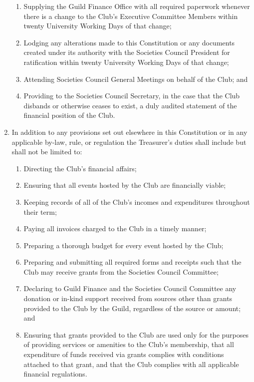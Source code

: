\documentclass[12pt]{article}
\begin{document}
\begin{enumerate}[label=9.\arabic*]
\begin{enumerate}[label=\theenumi.\arabic*]
        \item Supplying the Guild Finance Office with all required paperwork whenever there is a change to the Club's Executive Committee Members within twenty University Working Days of that change;
        \item Lodging any alterations made to this Constitution or any documents created under its authority with the Societies Council President for ratification within twenty University Working Days of that change;
        \item Attending Societies Council General Meetings on behalf of the Club; and
        \item Providing to the Societies Council Secretary, in the case that the Club disbands or otherwise ceases to exist, a duly audited statement of the financial position of the Club.
    \end{enumerate}
\item In addition to any provisions set out elsewhere in this Constitution or in any applicable by-law, rule, or regulation the Treasurer's duties shall include but shall not be limited to:
    \begin{enumerate}[label=\theenumi.\arabic*]
        \item Directing the Club's financial affairs;
        \item Ensuring that all events hosted by the Club are financially viable;
        \item Keeping records of all of the Club's incomes and expenditures throughout their term;
        \item Paying all invoices charged to the Club in a timely manner;
        \item Preparing a thorough budget for every event hosted by the Club;
        \item Preparing and submitting all required forms and receipts such that the Club may receive grants from the Societies Council Committee;
        \item Declaring to Guild Finance and the Societies Council Committee any donation or in-kind support received from sources other than grants provided to the Club by the Guild, regardless of the source or amount; and
        \item Ensuring that grants provided to the Club are used only for the purposes of providing services or amenities to the Club's membership, that all expenditure of funds received via grants complies with conditions attached to that grant, and that the Club complies with all applicable financial regulations.

\end{enumerate}
\end{enumerate}
\end{document}
